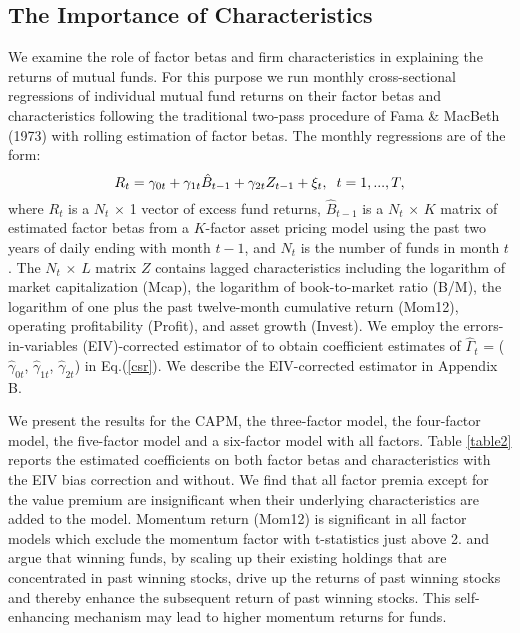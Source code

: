 \subsection{The Importance of Characteristics}
\label{section2C}
We examine the role of factor betas and firm characteristics in explaining the returns of mutual funds. For this purpose we run monthly cross-sectional regressions of individual mutual fund returns on their factor betas and characteristics following the traditional two-pass procedure of Fama \& MacBeth (1973) with rolling estimation of factor betas. The monthly regressions are of the form: 
\begin{equation}
\label{csr}
R_{t} = \gamma_{0t} + \gamma_{1t}\hat{B}_{t-1} + \gamma_{2t}Z_{t-1} + \xi_{t}, \hspace{0.2cm} t=1,...,T,
\end{equation}
where $R_t$ is a $N_t$ $\times$ 1 vector of excess fund returns, $\hat{B}_{t-1}$ is a $N_t$ $\times$ $K$ matrix of estimated factor betas from a $K$-factor asset pricing model using the past two years of daily ending with month $t-1$, and $N_t$ is the number of funds in month $t$. The $N_t$ $\times$ $L$ matrix $Z$ contains lagged characteristics including the logarithm of market capitalization (Mcap), the logarithm of book-to-market ratio (B/M), the logarithm of one plus the past twelve-month cumulative return (Mom12), operating profitability (Profit), and asset growth (Invest).
We employ the errors-in-variables (EIV)-corrected estimator of \citet{chordia2015cross} to obtain coefficient estimates of $\hat{\Gamma}_{t}$ = ($\hat{\gamma}_{0t}$, $\hat{\gamma}_{1t}$, $\hat{\gamma}_{2t}$) in Eq.(\ref{csr}). We describe the EIV-corrected estimator in Appendix B.
\par We present the results for the CAPM, the \citet{fama1993common} three-factor model, the \citet{carhart1997persistence} four-factor model, the \citet{FAMA20151} five-factor model and a six-factor model with all factors. Table \ref{table2} reports the estimated coefficients on both factor betas and characteristics with the EIV bias correction and without. We find that all factor premia except for the value premium are insignificant when their underlying characteristics are added to the model. Momentum return (Mom12) is significant in all factor models which exclude the momentum factor with t-statistics just above 2. \citet{lou2012flow} and \citet{vayanos2013institutional} argue that winning funds, by scaling up their existing holdings that are concentrated in past winning stocks, drive up the returns of past winning stocks and thereby enhance the subsequent return of past winning stocks. This self-enhancing mechanism may lead to higher momentum returns for funds. 

